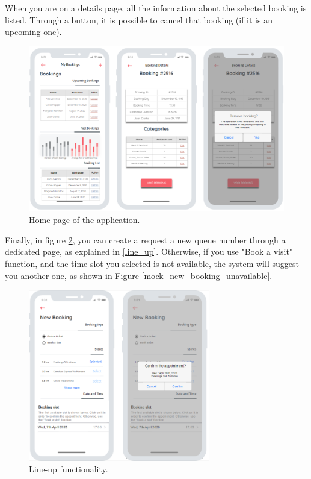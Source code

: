 \documentclass[table, 12pt]{article}
\begin{document}
When you are on a details page, all the information about the selected booking is listed. Through a button, it is possible to cancel that booking (if it is an upcoming one).

\begin{figure}[H]
    \begin{center}
        \includegraphics[width=\textwidth]{assets/Mockups/mock_bookings.png}
        \caption{Home page of the application.}
        \label{mock_bookings}
    \end{center}
\end{figure}

Finally, in figure \ref{mock_new_booking}, you can create a request a new queue number through a dedicated page, as explained in \ref{line_up}.
Otherwise, if you use "Book a visit" function, and the time slot you selected is not available, the system will suggest you another one, as shown in Figure \ref{mock_new_booking_unavailable}.

\begin{figure}[H]
    \begin{center}
        \includegraphics[width=225pt]{assets/Mockups/mock_line_up.png}
        \caption{Line-up functionality.}
        \label{mock_new_booking}
    \end{center}
\end{figure}
\end{document}

